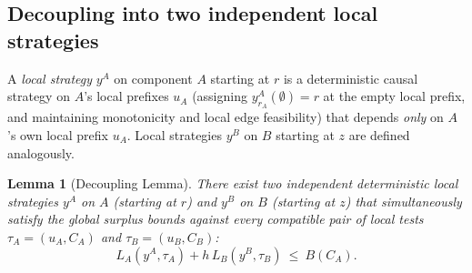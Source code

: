 \documentclass[11pt,letterpaper]{article}
\newtheorem{lemma}{Lemma}[section]
\begin{document}
\subsection{Decoupling into two independent local strategies}

A \emph{local strategy} $y^A$ on component $A$ starting at $r$ is a deterministic causal strategy on $A$'s local prefixes $u_A$ (assigning $y^A_{r_A}(\emptyset)=r$ at the empty local prefix, and maintaining monotonicity and local edge feasibility) that depends \emph{only} on $A$'s own local prefix $u_A$. Local strategies $y^B$ on $B$ starting at $z$ are defined analogously.

\begin{lemma}[Decoupling Lemma]\label{lem:decoupling}
There exist two independent deterministic local strategies $y^A$ on $A$ (starting at $r$) and $y^B$ on $B$ (starting at $z$) that simultaneously satisfy the global surplus bounds against \emph{every} compatible pair of local tests $\tau_A=(u_A,C_A)$ and $\tau_B=(u_B,C_B)$:
\[
  L_A(y^A,\tau_A) + h\,L_B(y^B,\tau_B)\ \le\ B(C_A).
\]
\end{lemma}
\end{document}
